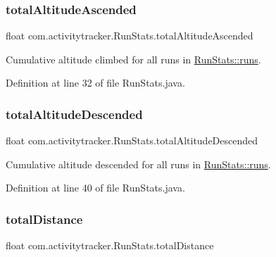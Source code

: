 \subsubsection{\texorpdfstring{total\+Altitude\+Ascended}{totalAltitudeAscended}}
{\footnotesize\ttfamily float com.\+activitytracker.\+Run\+Stats.\+total\+Altitude\+Ascended\hspace{0.3cm}{\ttfamily [package]}}

Cumulative altitude climbed for all runs in \mbox{\hyperlink{classcom_1_1activitytracker_1_1_run_stats_a0fd429e9f463ddf4897c507c0e3c0a12}{Run\+Stats\+::runs}}. 

Definition at line 32 of file Run\+Stats.\+java.

\mbox{\label{classcom_1_1activitytracker_1_1_run_stats_ae511b3772f61773885d0178b215786d7}} 
\subsubsection{\texorpdfstring{total\+Altitude\+Descended}{totalAltitudeDescended}}
{\footnotesize\ttfamily float com.\+activitytracker.\+Run\+Stats.\+total\+Altitude\+Descended\hspace{0.3cm}{\ttfamily [package]}}

Cumulative altitude descended for all runs in \mbox{\hyperlink{classcom_1_1activitytracker_1_1_run_stats_a0fd429e9f463ddf4897c507c0e3c0a12}{Run\+Stats\+::runs}}. 

Definition at line 40 of file Run\+Stats.\+java.

\mbox{\label{classcom_1_1activitytracker_1_1_run_stats_a2e9486ea214a828e9f58489fd2b1a718}} 
\subsubsection{\texorpdfstring{total\+Distance}{totalDistance}}
{\footnotesize\ttfamily float com.\+activitytracker.\+Run\+Stats.\+total\+Distance\hspace{0.3cm}{\ttfamily [package]}}

